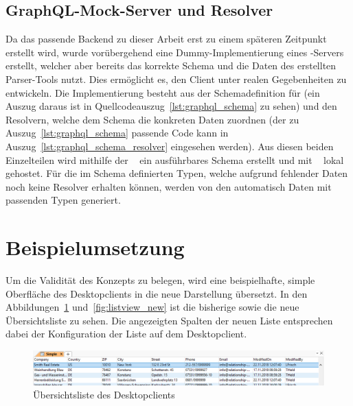 \subsection{GraphQL-Mock-Server und Resolver}
Da das passende Backend zu dieser Arbeit erst zu einem späteren Zeitpunkt erstellt wird, wurde vorübergehend eine Dummy-Implementierung eines -Servers erstellt, welcher aber bereits das korrekte Schema und die Daten des erstellten Parser-Tools nutzt. Dies ermöglicht es, den Client unter realen Gegebenheiten zu entwickeln. Die Implementierung besteht aus der Schemadefinition für  (ein Auszug daraus ist in Quellcodeauszug~\ref{lst:graphql_schema} zu sehen) und den Resolvern, welche dem Schema die konkreten Daten zuordnen (der zu Auszug~\ref{lst:graphql_schema} passende Code kann in Auszug~\ref{lst:graphql_schema_resolver} eingesehen werden). Aus diesen beiden Einzelteilen wird mithilfe der ~\parencite{apollo_graphql-tools_2019} ein ausführbares Schema erstellt und mit ~\parencite{express_graphql_2018} lokal gehostet. Für die im Schema definierten Typen, welche aufgrund fehlender Daten noch keine Resolver erhalten können, werden von den  automatisch Daten mit passenden Typen generiert.





\section{Beispielumsetzung}
Um die Validität des Konzepts zu belegen, wird eine beispielhafte, simple Oberfläche des  Desktopclients in die neue Darstellung übersetzt. In den Abbildungen~\ref{fig:listview_crm} und~\ref{fig:listview_new} ist die bisherige sowie die neue Übersichtsliste zu sehen. Die angezeigten Spalten der neuen Liste entsprechen dabei der Konfiguration der Liste auf dem Desktopclient. 

\begin{figure}
    \centering
    \captionsetup{justification=centering}
    \includegraphics[width=\textwidth]{figures/listview_crm.png}
        \caption{Übersichtsliste des Desktopclients}\label{fig:listview_crm}
\end{figure}

